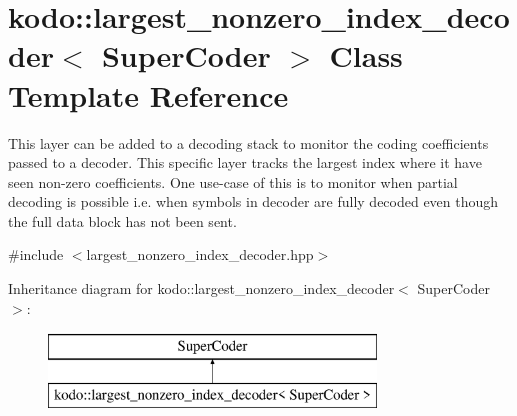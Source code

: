 \hypertarget{classkodo_1_1largest__nonzero__index__decoder}{\section{kodo\-:\-:largest\-\_\-nonzero\-\_\-index\-\_\-decoder$<$ Super\-Coder $>$ Class Template Reference}
\label{classkodo_1_1largest__nonzero__index__decoder}
}


This layer can be added to a decoding stack to monitor the coding coefficients passed to a decoder. This specific layer tracks the largest index where it have seen non-\/zero coefficients. One use-\/case of this is to monitor when partial decoding is possible i.\-e. when symbols in decoder are fully decoded even though the full data block has not been sent.  




{\ttfamily \#include $<$largest\-\_\-nonzero\-\_\-index\-\_\-decoder.\-hpp$>$}

Inheritance diagram for kodo\-:\-:largest\-\_\-nonzero\-\_\-index\-\_\-decoder$<$ Super\-Coder $>$\-:\begin{figure}[H]
\begin{center}
\leavevmode
\includegraphics[height=2.000000cm]{classkodo_1_1largest__nonzero__index__decoder}
\end{center}
\end{figure}
